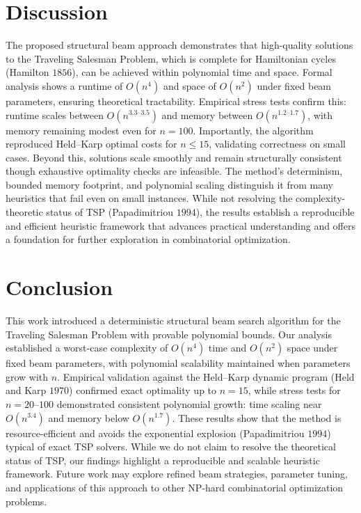 \documentclass[sn-mathphys]{article}
\theoremstyle{thmstyleone}%
\theoremstyle{thmstyletwo}%
\theoremstyle{thmstylethree}%
\begin{document}
\section{Discussion}
The proposed structural beam approach demonstrates that high-quality solutions to the Traveling Salesman Problem, which is complete for Hamiltonian cycles (Hamilton $1856$), can be achieved within polynomial time and space. Formal analysis shows a runtime of $O(n^{4})$ and space of $O(n^{2})$ under fixed beam parameters, ensuring theoretical tractability. Empirical stress tests confirm this: runtime scales between $O(n^{3.3\text{--}3.5})$ and memory between $O(n^{1.2\text{--}1.7})$, with memory remaining modest even for $n=100$. Importantly, the algorithm reproduced Held--Karp optimal costs for $n \leq 15$, validating correctness on small cases. Beyond this, solutions scale smoothly and remain structurally consistent though exhaustive optimality checks are infeasible. The method’s determinism, bounded memory footprint, and polynomial scaling distinguish it from many heuristics that fail even on small instances. While not resolving the complexity-theoretic status of TSP (Papadimitriou $1994$), the results establish a reproducible and efficient heuristic framework that advances practical understanding and offers a foundation for further exploration in combinatorial optimization.

\section{Conclusion}
This work introduced a deterministic structural beam search algorithm for the Traveling Salesman Problem with provable polynomial bounds. Our analysis established a worst-case complexity of $O(n^{4})$ time and $O(n^{2})$ space under fixed beam parameters, with polynomial scalability maintained when parameters grow with $n$. Empirical validation against the Held--Karp dynamic program (Held and Karp $1970$) confirmed exact optimality up to $n=15$, while stress tests for $n=20$--$100$ demonstrated consistent polynomial growth: time scaling near $O(n^{3.4})$ and memory below $O(n^{1.7})$. These results show that the method is resource-efficient and avoids the exponential explosion (Papadimitriou $1994$) typical of exact TSP solvers. While we do not claim to resolve the theoretical status of TSP, our findings highlight a reproducible and scalable heuristic framework. Future work may explore refined beam strategies, parameter tuning, and applications of this approach to other NP-hard combinatorial optimization problems.  
\end{document}
